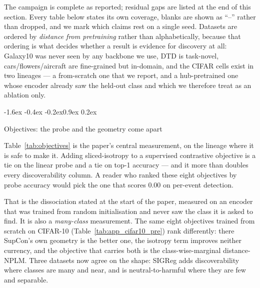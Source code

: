 \documentclass{article}
\makeatletter
\renewcommand\subsection{\@startsection{subsection}{2}{\z@}%
  {-1.6ex \@plus -0.4ex \@minus -0.2ex}{0.9ex \@plus 0.2ex}%
  {\normalsize\bf\raggedright}}
\makeatother
\begin{document}
The campaign is complete as reported; residual gaps are listed at the end of
this section. Every table below states its own
coverage, blanks are shown as ``--'' rather than dropped, and we mark which
claims rest on a single seed. Datasets are ordered by \emph{distance from
pretraining} rather than alphabetically, because that ordering is what decides
whether a result is evidence for discovery at all: Galaxy10
\citep{leung2019astronn,walmsley2022gzdecals} was never seen by any backbone
we use, DTD \citep{cimpoi2014dtd} is task-novel, cars/flowers/aircraft
\citep{krause2013cars,nilsback2008flowers,maji2013aircraft} are fine-grained
but in-domain, and the CIFAR cells \citep{krizhevsky2009cifar} exist in two
lineages --- a from-scratch
one that we report, and a hub-pretrained one whose encoder already saw the
held-out class and which we therefore treat as an ablation only.

\subsection{Objectives: the probe and the geometry come apart}


Table~\ref{tab:objectives} is the paper's central measurement, on the lineage
where it is safe to make it. Adding sliced-isotropy to a supervised
contrastive objective is a tie on the linear probe and a tie on top-1
accuracy --- and it more than doubles every discoverability column.
A reader who ranked these eight objectives by probe accuracy would pick the
one that scores $0.00$ on per-event detection.

That is the dissociation stated at the start of the paper, measured on an
encoder that was trained from random initialisation and never saw the class it
is asked to find. It is also a \emph{many-class} measurement. The same eight
objectives trained from scratch on CIFAR-10 (Table~\ref{tab:app_cifar10_pre})
rank differently: there SupCon's own geometry is the better one, the isotropy
term improves neither currency, and the objective that carries both is
the class-wise-marginal distance-NPLM. Three datasets now agree on the shape:
SIGReg adds discoverability where classes are many and near, and is
neutral-to-harmful where they are few and separable.
\end{document}
